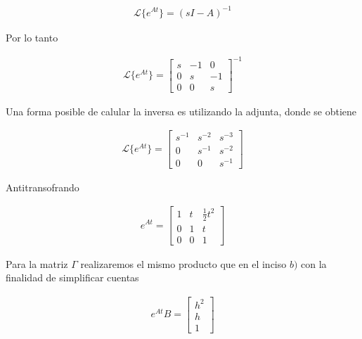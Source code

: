 \documentclass{article}
\begin{document}
        \begin{eqnarray}
            \mathcal{L} \{ e^{At} \} = (sI - A)^{-1}
        \end{eqnarray}

        Por lo tanto 

        \begin{eqnarray}
            \mathcal{L} \{ e^{At} \} = 
            \begin{bmatrix}
                s & -1 & 0 \\
                0 & s & -1 \\
                0 & 0 & s    
            \end{bmatrix}^{-1}
        \end{eqnarray}

        Una forma posible de calular la inversa es utilizando la adjunta, donde se obtiene 

        \begin{eqnarray}
            \mathcal{L} \{ e^{At} \} = 
            \begin{bmatrix}
                s^{-1} & s^{-2} & s^{-3} \\ 
                0   & s^{-1} & s^{-2} \\ 
                0 & 0 & s^{-1}
            \end{bmatrix}
        \end{eqnarray}

        Antitransofrando 

        \begin{eqnarray}
            e^{At} = \begin{bmatrix}
                1 & t & \frac{1}{2}t^2 \\ 
                0 & 1 & t \\
                0 & 0 & 1 
            \end{bmatrix}
        \end{eqnarray}


        Para la matriz $\Gamma$ realizaremos el mismo producto que en el inciso $b)$ con la finalidad de simplificar cuentas 

        \begin{eqnarray}
            e^{At}B = 
            \begin{bmatrix}
                h^2 \\ h \\ 1     
            \end{bmatrix}
        \end{eqnarray}
\end{document}
